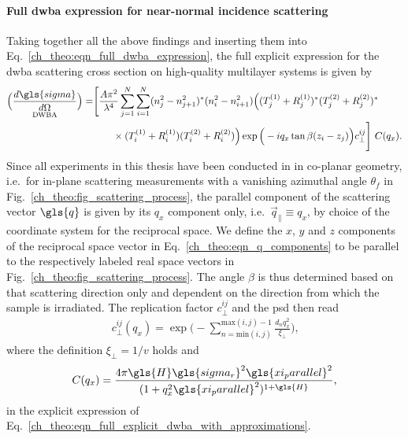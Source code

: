 \paragraph{Full \gls{dwba} expression for near-normal incidence scattering}
Taking together all the above findings and inserting them into Eq.~\eqref{ch_theo:eqn_full_dwba_expression}, the full explicit expression for the \gls{dwba} scattering cross section on high-quality multilayer systems is given by
    \begin{align}
        {\underset{\text{DWBA}}{\Big(\frac{d \gls{sigma}}{d \Omega}\Big)}} = &\Bigg[\frac{A \pi^2}{\lambda^4}\sum \limits_{j=1}^{N}\sum \limits_{i=1}^{N} (n_j^2 - n_{j+1}^2)^* (n_i^2 - n_{i+1}^2)\Big( (T^{(1)}_j + R^{(1)}_j)^* (T^{(2)}_j + R^{(2)}_j)^* \nonumber \\ &\qquad\times(T^{(1)}_i + R^{(1)}_i) (T^{(2)}_i + R^{(2)}_i) \Big) \exp\Big(-i q_x \tan \beta (z_i-z_j)\Big) c_\perp^{i j}\Bigg]\,\, C(q_x) \text{.} \label{ch_theo:eqn_full_explicit_dwba_with_approximations}
    \end{align}
Since all experiments in this thesis have been conducted in in co-planar geometry, i.e.~for in-plane scattering measurements with a vanishing azimuthal angle $\theta_f$ in Fig.~\ref{ch_theo:fig_scattering_process}, the parallel component of the scattering vector $\gls{q}$ is given by its $q_x$ component only, i.e.~$\vec{q}_\parallel \equiv q_x$, by choice of the coordinate system for the reciprocal space. We define the $x$, $y$ and $z$ components of the reciprocal space vector in Eq.~\eqref{ch_theo:eqn_q_components} to be parallel to the respectively labeled real space vectors in Fig.~\ref{ch_theo:fig_scattering_process}. The angle $\beta$ is thus determined based on that scattering direction only and dependent on the direction from which the sample is irradiated. The replication factor $c_\perp^{i j}$ and the \gls{psd} then read
\begin{align}
c_\perp^{i j}(q_x) =  \exp\Bigg(-\sum \limits_{n = \text{min}(i,j)}^{\text{max}(i,j)-1}\frac{d_n q_x^2}{\xi_\perp} \Bigg)\text{,} \label{ch_theo:eqn_vertical_roughness_correlation_length_explicit}
\end{align}
where the definition $\xi_\perp = 1/v$ holds and
\begin{align}
C(q_x) = \frac{4 \pi \gls{H} \gls{sigma_r}^2 \gls{xi_parallel}^2}{(1+q_x^2\gls{xi_parallel}^2)^{1+\gls{H}}} \text{,}
\end{align}
in the explicit expression of Eq.~\eqref{ch_theo:eqn_full_explicit_dwba_with_approximations}.


